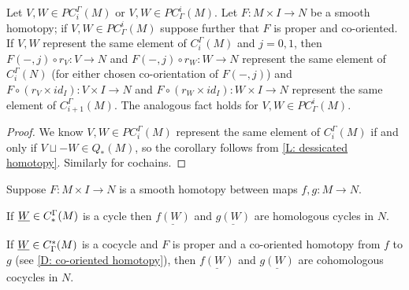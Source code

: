 \begin{corollary}\label{C: chain homotopy}
	Let $V, W \in PC_i^\Gamma(M)$ or $V, W \in PC^i_\Gamma(M)$.
	Let $F \colon M \times I \to N$ be a smooth homotopy; if $V,W \in PC^i_\Gamma(M)$ suppose further that $F$ is proper and co-oriented.
	If $V,W$ represent the same element of $C_i^\Gamma(M)$ and $j=0,1$, then $F(-,j) \circ r_V: V \to N$ and	$F(-,j) \circ r_W \colon W \to N$ represent the same element of $C_i^\Gamma(N)$ (for either chosen co-orientation of $F(-,j)$) and $F \circ (r_V \times id_I) \colon V \times I \to N$ and $F \circ (r_W \times id_I) \colon W \times I \to N$ represent the same element of $C_{i+1}^\Gamma(M)$.
	The analogous fact holds for $V, W \in PC^i_\Gamma(M)$.
\end{corollary}

\begin{proof}
	We know $V, W \in PC_i^\Gamma(M)$ represent the same element of $C_i^\Gamma(M)$ if and only if $V \sqcup -W \in Q_*(M)$, so the corollary follows from \cref{L: dessicated homotopy}.
	Similarly for cochains.
\end{proof}

\begin{corollary}\label{C: homotopy}
	Suppose $F \colon M \times I \to N$ is a smooth homotopy between maps $f,g \colon M \to N$.

	If $\underline{W} \in C_*^\Gamma(M)$ is a cycle then $\underline{f(W)}$ and $\underline{g(W)}$ are homologous cycles in $N$.

	If $\underline{W} \in C^*_\Gamma(M)$ is a cocycle and $F$ is proper and a co-oriented homotopy from $f$ to $g$ (see \cref{D: co-oriented homotopy}), then $\underline{f(W)}$ and $\underline{g(W)}$ are cohomologous cocycles in $N$.
\end{corollary}

